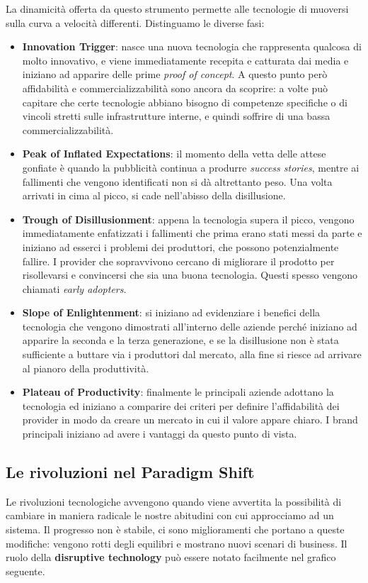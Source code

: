 \noindent La dinamicità offerta da questo strumento permette alle tecnologie di muoversi sulla curva a velocità differenti. Distinguamo le diverse fasi:
\begin{itemize}
    \item \textbf{Innovation Trigger}: nasce una nuova tecnologia che rappresenta qualcosa di molto innovativo, e viene immediatamente recepita e catturata dai media e iniziano ad apparire delle prime \textit{proof of concept}. A questo punto però affidabilità e commercializzabilità sono ancora da scoprire: a volte può capitare che certe tecnologie abbiano bisogno di competenze specifiche o di vincoli stretti sulle infrastrutture interne, e quindi soffrire di una bassa commercializzabilità.
    \item \textbf{Peak of Inflated Expectations}: il momento della vetta delle attese gonfiate è quando la pubblicità continua a produrre \textit{success stories}, mentre ai fallimenti che vengono identificati non si dà altrettanto peso. Una volta arrivati in cima al picco, si cade nell'abisso della disillusione.
    \item \textbf{Trough of Disillusionment}: appena la tecnologia supera il picco, vengono immediatamente enfatizzati i fallimenti che prima erano stati messi da parte e iniziano ad esserci i problemi dei produttori, che possono potenzialmente fallire. I provider che sopravvivono cercano di migliorare il prodotto per risollevarsi e convincersi che sia una buona tecnologia. Questi spesso vengono chiamati \textit{early adopters}.
    \item \textbf{Slope of Enlightenment}: si iniziano ad evidenziare i benefici della tecnologia che vengono dimostrati all'interno delle aziende perché iniziano ad apparire la seconda e la terza generazione, e se la disillusione non è stata sufficiente a buttare via i produttori dal mercato, alla fine si riesce ad arrivare al pianoro della produttività.
    \item \textbf{Plateau of Productivity}: finalmente le principali aziende adottano la tecnologia ed iniziano a comparire dei criteri per definire l'affidabilità dei provider in modo da creare un mercato in cui il valore appare chiaro. I brand principali iniziano ad avere i vantaggi da questo punto di vista.
\end{itemize}
\subsection{Le rivoluzioni nel Paradigm Shift}
Le rivoluzioni tecnologiche avvengono quando viene avvertita la possibilità di cambiare in maniera radicale le nostre abitudini con cui approcciamo ad un sistema. Il progresso non è stabile, ci sono miglioramenti che portano a queste modifiche: vengono rotti degli equilibri e mostrano nuovi scenari di business. Il ruolo della \textbf{disruptive technology} può essere notato facilmente nel grafico seguente.

